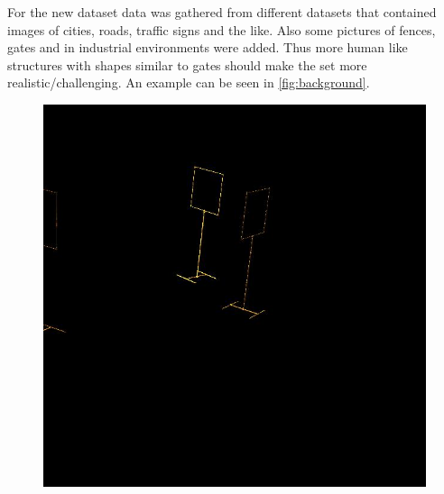 \documentclass{article}
\begin{document}
For the new dataset data was gathered from different datasets that contained images of cities, roads, traffic signs and the like. Also some pictures of fences, gates and in industrial environments were added. Thus more human like structures with shapes similar to gates should make the set more realistic/challenging. An example can be seen in \autoref{fig:background}. 

\begin{figure}[h]
	\centering
	\begin{minipage}{0.24\textwidth}
		\centering
		\includegraphics[width=\textwidth]{../fig/gates}


\end{minipage}
\end{figure}
\end{document}
